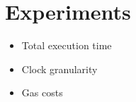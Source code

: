 \section{Experiments}

\begin{itemize}
\item Total execution time
\item Clock granularity
\item Gas costs
\end{itemize}

